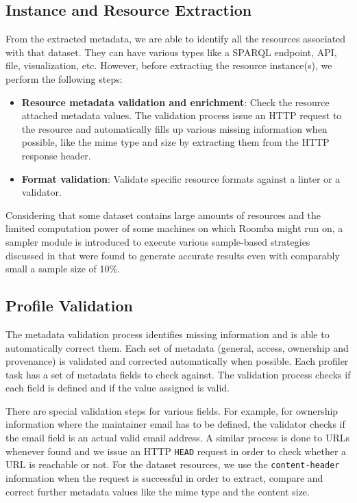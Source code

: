 \documentclass{sig-alternate}
\begin{document}
\subsection{Instance and Resource Extraction}
From the extracted metadata, we are able to identify all the resources associated with that dataset. They can have various types like a SPARQL endpoint, API, file, visualization, etc. However, before extracting the resource instance(s), we perform the following steps:
\begin{itemize}
  \item \textbf{Resource metadata validation and enrichment}: Check the resource attached metadata values. The validation process issue an HTTP request to the resource and automatically fills up various missing information when possible, like the mime type and size by extracting them from the HTTP response header.
  \item \textbf{Format validation}: Validate specific resource formats against a linter or a validator.
\end{itemize}

Considering that some dataset contains large amounts of resources and the limited computation power of some machines on which Roomba might run on, a sampler module is introduced to execute various sample-based strategies discussed in \cite{scalableApproach} that were found to generate accurate results even with comparably small a sample size of 10\%.

\subsection{Profile Validation}
The metadata validation process identifies missing information and is able to automatically correct them. Each set of metadata (general, access, ownership and provenance) is validated and corrected automatically when possible. Each profiler task has a set of metadata fields to check against. The validation process checks if each field is defined and if the value assigned is valid.

There are special validation steps for various fields. For example, for ownership information where the maintainer email has to be defined, the validator checks if the email field is an actual valid email address. A similar process is done to URLs whenever found and we issue an HTTP \texttt{HEAD} request in order to check whether a URL is reachable or not. For the dataset resources, we use the \texttt{content-header} information when the request is successful in order to extract, compare and correct further metadata values like the mime type and the content size.
\end{document}
